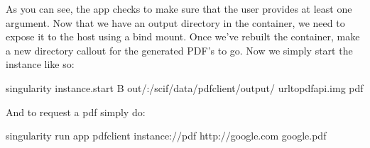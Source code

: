 \documentclass[letterpaper,10pt,english]{sphinxmanual}
\begin{document}
%
\begin{sphinxVerbatim}[commandchars=\\\{\}]
 

     \PYG{p}{[}   \PYG{p}{]} 

         

         


       
\end{sphinxVerbatim}

As you can see, the  app checks to make sure that the user provides at
least one argument. Now that we have an output directory in the
container, we need to expose it to the host using a bind mount. Once
we’ve rebuilt the container, make a new directory callout  for the
generated PDF’s to go. Now we simply start the instance like so:

%
\begin{sphinxVerbatim}[commandchars=\\\{\}]
\PYGZdl{} singularity instance.start \PYGZhy{}B out/:/scif/data/pdf\PYGZus{}client/output/ url\PYGZhy{}to\PYGZhy{}pdf\PYGZhy{}api.img pdf
\end{sphinxVerbatim}

And to request a pdf simply do:

%
\begin{sphinxVerbatim}[commandchars=\\\{\}]
\PYGZdl{} singularity run \PYGZhy{}\PYGZhy{}app pdf\PYGZus{}client instance://pdf http://google.com google.pdf
\end{sphinxVerbatim}
\end{document}
